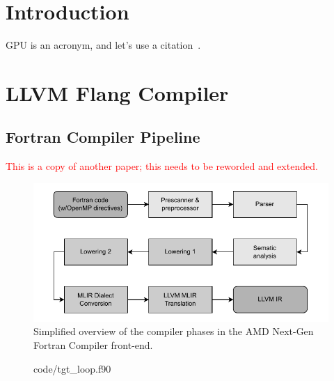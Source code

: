 \documentclass[acmtog,natbib=false]{acmart}
\newcommand{\todo}[1]{\textcolor{red}{#1}}
\newcommand{\code}[1]{\texttt{#1}\xspace}
\begin{document}


\maketitle

\section{Introduction}
\label{sec:Introduction}
\Ac{GPU} is an acronym, and let's use a citation~\cite{AMD24}.

\section{LLVM Flang Compiler}
\label{sec:LLVMFlangCompiler}

\subsection{Fortran Compiler Pipeline}
\label{sec:FortranCompilerPipeline}
\todo{This is a copy of another paper; this needs to be reworded and extended.}

\begin{figure}[t]
\centering
\includegraphics[width=\linewidth]{figures/flang_compiler_phases_overview.pdf}
\caption{Simplified overview of the compiler phases in the AMD Next-Gen Fortran Compiler front-end.\label{fig:FlangCompilerPhases}}
\end{figure}

\begin{figure}[t]

                {code/tgt_loop.f90}
\end{figure}
\end{document}
